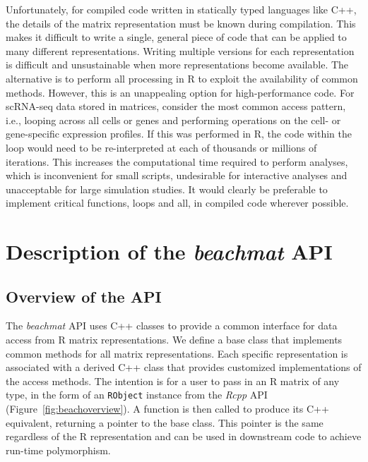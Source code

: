 \documentclass[10pt,letterpaper]{article}
\newcommand{\beachmat}{\textit{beachmat}}
\newcommand{\code}[1]{\texttt{#1}}
\begin{document}
Unfortunately, for compiled code written in statically typed languages like C++, the details of the matrix representation must be known during compilation.
This makes it difficult to write a single, general piece of code that can be applied to many different representations.
Writing multiple versions for each representation is difficult and unsustainable when more representations become available.
The alternative is to perform all processing in R to exploit the availability of common methods.
However, this is an unappealing option for high-performance code.
For scRNA-seq data stored in matrices, consider the most common access pattern, i.e., looping across all cells or genes and performing operations on the cell- or gene-specific expression profiles.
If this was performed in R, the code within the loop would need to be re-interpreted at each of thousands or millions of iterations.
This increases the computational time required to perform analyses, which is inconvenient for small scripts, undesirable for interactive analyses and unacceptable for large simulation studies.
It would clearly be preferable to implement critical functions, loops and all, in compiled code wherever possible.


\section*{Description of the \beachmat{} API}

\subsection*{Overview of the API}
The \beachmat{} API uses C++ classes to provide a common interface for data access from R matrix representations.
We define a base class that implements common methods for all matrix representations.
Each specific representation is associated with a derived C++ class that provides customized implementations of the access methods.
The intention is for a user to pass in an R matrix of any type, in the form of an \code{RObject} instance from the \textit{Rcpp} API (Figure~\ref{fig:beachoverview}).
A function is then called to produce its C++ equivalent, returning a pointer to the base class.
This pointer is the same regardless of the R representation and can be used in downstream code to achieve run-time polymorphism.
\end{document}
